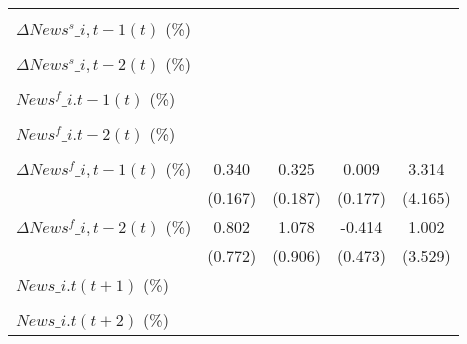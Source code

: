 {\begin{tabular}{l*{4}{c}}
                    &                     &                     &                     &                     \\
\addlinespace
$ \Delta News^s\_{i,t-1}(t)$ (\%)&                     &                     &                     &                     \\
                    &                     &                     &                     &                     \\
\addlinespace
$ \Delta News^s\_{i,t-2}(t)$ (\%)&                     &                     &                     &                     \\
                    &                     &                     &                     &                     \\
\addlinespace
$ News^f\_{i.t-1}(t)$ (\%)&                     &                     &                     &                     \\
                    &                     &                     &                     &                     \\
\addlinespace
$ News^f\_{i.t-2}(t)$ (\%)&                     &                     &                     &                     \\
                    &                     &                     &                     &                     \\
\addlinespace
$ \Delta News^f\_{i,t-1}(t)$ (\%)&       0.340\sym{**} &       0.325\sym{*}  &       0.009         &       3.314         \\
                    &     (0.167)         &     (0.187)         &     (0.177)         &     (4.165)         \\
\addlinespace
$ \Delta News^f\_{i,t-2}(t)$ (\%)&       0.802         &       1.078         &      -0.414         &       1.002         \\
                    &     (0.772)         &     (0.906)         &     (0.473)         &     (3.529)         \\
\addlinespace
$ News\_{i.t}(t+1)$ (\%)&                     &                     &                     &                     \\
                    &                     &                     &                     &                     \\
\addlinespace
$ News\_{i.t}(t+2)$ (\%)&                     &                     &                     &                     \\

\end{tabular}}
